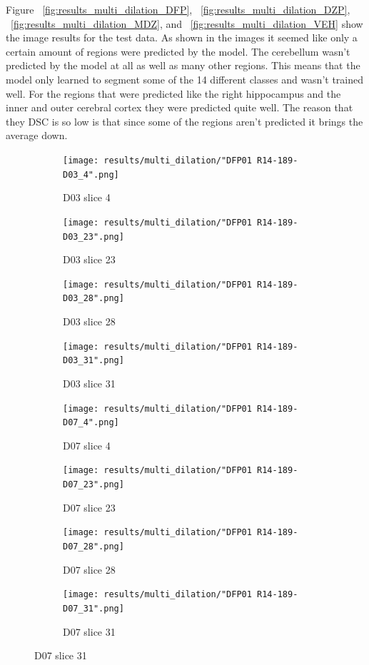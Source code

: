 Figure ~\ref{fig:results_multi_dilation_DFP}, ~\ref{fig:results_multi_dilation_DZP}, ~\ref{fig:results_multi_dilation_MDZ}, and ~\ref{fig:results_multi_dilation_VEH} show the image results for the test data.
As shown in the images it seemed like only a certain amount of regions were predicted by the model. 
The cerebellum wasn't predicted by the model at all as well as many other regions. 
This means that the model only learned to segment some of the 14 different classes and wasn't trained well.
For the regions that were predicted like the right hippocampus and the inner and outer cerebral cortex they were predicted quite well. 
The reason that they DSC is so low is that since some of the regions aren't predicted it brings the average down.



\begin{figure}[!htb]  
    \centering %
\begin{subfigure}{0.25\textwidth}
  \texttt{[image: results/multi\_dilation/"DFP01 R14-189-D03\_4".png]}
  \caption{D03 slice 4} 
\end{subfigure}\hfil %
\begin{subfigure}{0.25\textwidth}
  \texttt{[image: results/multi\_dilation/"DFP01 R14-189-D03\_23".png]}
  \caption{D03 slice 23}
\end{subfigure}\hfil %
\begin{subfigure}{0.25\textwidth}
  \texttt{[image: results/multi\_dilation/"DFP01 R14-189-D03\_28".png]}
  \caption{D03 slice 28}
\end{subfigure}\hfil %
\begin{subfigure}{0.25\textwidth}
  \texttt{[image: results/multi\_dilation/"DFP01 R14-189-D03\_31".png]}
  \caption{D03 slice 31}
\end{subfigure}


\medskip
\begin{subfigure}{0.25\textwidth}
  \texttt{[image: results/multi\_dilation/"DFP01 R14-189-D07\_4".png]}
  \caption{D07 slice 4}
\end{subfigure}\hfil %
\begin{subfigure}{0.25\textwidth}
  \texttt{[image: results/multi\_dilation/"DFP01 R14-189-D07\_23".png]}
  \caption{D07 slice 23}
\end{subfigure}\hfil %
\begin{subfigure}{0.25\textwidth}
  \texttt{[image: results/multi\_dilation/"DFP01 R14-189-D07\_28".png]}
  \caption{D07 slice 28}
\end{subfigure}\hfil %
\begin{subfigure}{0.25\textwidth}
  \texttt{[image: results/multi\_dilation/"DFP01 R14-189-D07\_31".png]}
  \caption{D07 slice 31}
\end{subfigure}



\end{figure}

